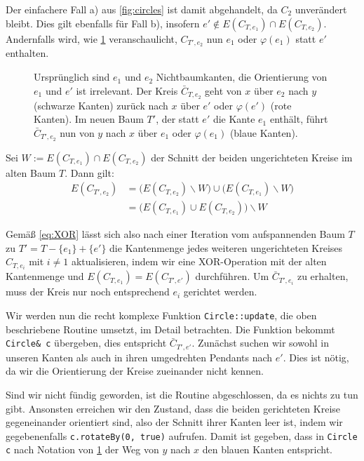 Der einfachere Fall a) aus \cref{fig:circles} ist damit abgehandelt, da $C_2$ unverändert bleibt. Dies gilt ebenfalls für Fall b), insofern $e'\notin E(C_{T,e_1})\cap E(C_{T,e_2})$. Andernfalls wird, wie \cref{fig:bypass} veranschaulicht, $C_{T',e_2}$ nun $e_1$ oder $\varphi(e_1)$ statt $e'$ enthalten.

\begin{figure}[!ht]\centering
    
    \caption{Ursprünglich sind $e_1$ und $e_2$ Nichtbaumkanten, die Orientierung von $e_1$ und $e'$ ist irrelevant. Der Kreis $\bar{C}_{T,e_2}$ geht von $x$ über $e_2$ nach $y$ (schwarze Kanten) zurück nach $x$ über $e'$ oder $\varphi(e')$ (rote Kanten). Im neuen Baum $T'$, der statt $e'$ die Kante $e_1$ enthält, führt $\bar{C}_{T',e_2}$ nun von $y$ nach $x$ über $e_1$ oder $\varphi(e_1)$ (blaue Kanten).}
    \label{fig:bypass}
\end{figure}

Sei $W:=E(C_{T,e_1})\cap E(C_{T,e_2})$ der Schnitt der beiden ungerichteten Kreise im alten Baum $T$. Dann gilt:
\begin{align}E(C_{T',e_2})&=\big(E(C_{T,e_2})\backslash W\big)\cup\big(E(C_{T,e_1})\backslash W\big)\nonumber\\
&=\big(E(C_{T,e_1})\cup E(C_{T,e_2})\big)\backslash W\label{eq:XOR}\end{align}

Gemäß \cref{eq:XOR} lässt sich also nach einer Iteration vom aufspannenden Baum $T$ zu $T'=T-\{e_1\}+\{e'\}$ die Kantenmenge jedes weiteren ungerichteten Kreises $C_{T,e_i}$ mit $i\neq1$  aktualisieren, indem wir eine XOR-Operation mit der alten Kantenmenge und $E(C_{T,e_1})=E(C_{T',e'})$ durchführen. Um $\bar{C}_{T',e_i}$ zu erhalten, muss der Kreis nur noch entsprechend $e_i$ gerichtet werden.

Wir werden nun die recht komplexe Funktion \lstinline|Circle::update|, die oben beschriebene Routine umsetzt, im Detail betrachten. Die Funktion bekommt \lstinline|Circle& c| übergeben, dies entspricht $\bar{C}_{T',e'}$. Zunächst suchen wir sowohl in unseren Kanten als auch in ihren umgedrehten Pendants nach $e'$. Dies ist nötig, da wir die Orientierung der Kreise zueinander nicht kennen.

Sind wir nicht fündig geworden, ist die Routine abgeschlossen, da es nichts zu tun gibt. Ansonsten erreichen wir den Zustand, dass die beiden gerichteten Kreise gegeneinander orientiert sind, also der Schnitt ihrer Kanten leer ist, indem wir gegebenenfalls \lstinline|c.rotateBy(0, true)| aufrufen. Damit ist gegeben, dass in \lstinline|Circle c| nach Notation von \cref{fig:bypass} der Weg von $y$ nach $x$ den blauen Kanten entspricht.

